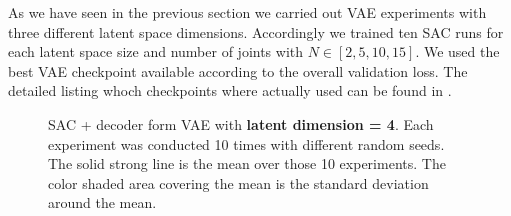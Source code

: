 As we have seen in the previous section we carried out VAE experiments with three different latent space dimensions. Accordingly we trained ten SAC runs for each latent space size and number of joints with $N \in [2, 5, 10, 15]$. We used the best VAE checkpoint available according to the overall validation loss. The detailed listing whoch checkpoints where actually used can be found in . 

\begin{figure}
    \begin{center}
        \hfill
    \end{center}
    \caption[SAC + VAE on latent dim = 4]{SAC + decoder form VAE with \textbf{latent dimension = 4}. Each experiment was conducted 10 times with different random seeds. The solid strong line is the mean over those 10 experiments. The color shaded area covering the mean is the standard deviation around the mean.}
    \label{fig:SAC_latent_4}
\end{figure}


